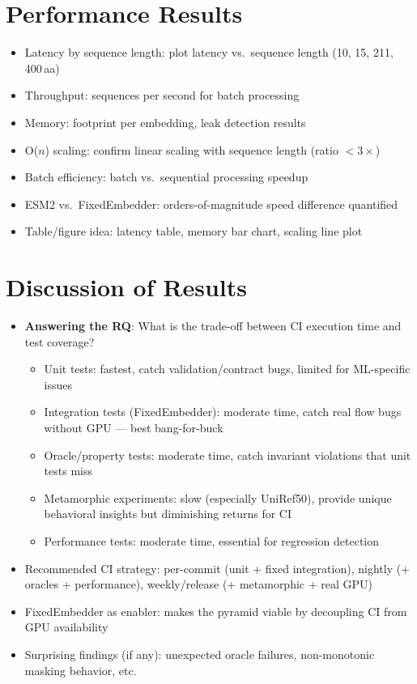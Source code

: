 \section{Performance Results}\label{sec:eval-performance}
\begin{itemize}
  \item Latency by sequence length: plot latency vs.\ sequence length (10, 15, 211, 400\,aa)
  \item Throughput: sequences per second for batch processing
  \item Memory: footprint per embedding, leak detection results
  \item O($n$) scaling: confirm linear scaling with sequence length (ratio $< 3\times$)
  \item Batch efficiency: batch vs.\ sequential processing speedup
  \item ESM2 vs.\ FixedEmbedder: orders-of-magnitude speed difference quantified
  \item Table/figure idea: latency table, memory bar chart, scaling line plot
\end{itemize}

\section{Discussion of Results}\label{sec:eval-discussion}
\begin{itemize}
  \item \textbf{Answering the RQ}: What is the trade-off between CI execution time and test coverage?
    \begin{itemize}
      \item Unit tests: fastest, catch validation/contract bugs, limited for ML-specific issues
      \item Integration tests (FixedEmbedder): moderate time, catch real flow bugs without GPU --- best bang-for-buck
      \item Oracle/property tests: moderate time, catch invariant violations that unit tests miss
      \item Metamorphic experiments: slow (especially UniRef50), provide unique behavioral insights but diminishing returns for CI
      \item Performance tests: moderate time, essential for regression detection
    \end{itemize}
  \item Recommended CI strategy: per-commit (unit + fixed integration), nightly (+ oracles + performance), weekly/release (+ metamorphic + real GPU)
  \item FixedEmbedder as enabler: makes the pyramid viable by decoupling CI from GPU availability
  \item Surprising findings (if any): unexpected oracle failures, non-monotonic masking behavior, etc.
\end{itemize}

